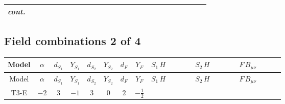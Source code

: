 \documentclass[8pt]{article}
\begin{document}
\begin{landscape}
\begin{longtable}{@{}cccccccc >{\raggedright\arraybackslash}p{0.21\linewidth} >{\raggedright\arraybackslash}p{0.21\linewidth} >{\raggedright\arraybackslash}p{0.21\linewidth}@{}}
\textit{cont.} &  &  &  &  &  &  &  & \scriptsize\adjustbox{max width=\linewidth}{$\begin{gathered} -\frac{2 \hbar  \log \left(\frac{\bar{\mu}^{2}}{m_2^2}\right) \overline{\lambda_5} H_{a_1} H_{a_2} m_2^2 \lambda_5 H_{a_1}{}^{\dagger } H_{a_2}{}^{\dagger }}{m_1^2-m_2^2}\end{gathered}$} &  &  \\
\midrule
\bottomrule
\end{longtable}
\clearpage
\subsection*{Field combinations 2 of 4}
\begin{longtable}{@{}cccccccc >{\raggedright\arraybackslash}p{0.21\linewidth} >{\raggedright\arraybackslash}p{0.21\linewidth} >{\raggedright\arraybackslash}p{0.21\linewidth}@{}}
\toprule
Model & $\alpha$ & $d_{S_1}$ & $Y_{S_1}$ & $d_{S_2}$ & $Y_{S_2}$ & $d_F$ & $Y_F$ & $S_1\,H$ & $S_2\,H$ & $F\,B_{\mu\nu}$ \\
\midrule
\endfirsthead
\toprule
Model & $\alpha$ & $d_{S_1}$ & $Y_{S_1}$ & $d_{S_2}$ & $Y_{S_2}$ & $d_F$ & $Y_F$ & $S_1\,H$ & $S_2\,H$ & $F\,B_{\mu\nu}$ \\
\midrule
\endhead
T3-E & $-2$ & $3$ & $-1$ & $3$ & $0$ & $2$ & $-\frac{1}{2}$ & \scriptsize\adjustbox{max width=\linewidth}{$\begin{gathered} +\frac{3 \hbar  H_{a_1} H_{a_2} H_{a_1}{}^{\dagger } H_{a_2}{}^{\dagger } \left(\lambda_{HS_1}^{(1)}^{(2)}\right){}^2}{2 \epsilon } \\ +\frac{3}{2} \hbar  \log \left(\frac{\bar{\mu}^{2}}{m_1^2}\right) H_{a_1} H_{a_2} H_{a_1}{}^{\dagger } H_{a_2}{}^{\dagger } \left(\lambda_{HS_1}^{(1)}^{(2)}\right){}^2\end{gathered}$} & \scriptsize\adjustbox{max width=\linewidth}{$\begin{gathered} +\frac{3 \hbar  H_{a_1} H_{a_2} H_{a_1}{}^{\dagger } H_{a_2}{}^{\dagger } \left(\lambda_{HS_2}^{(1)}^{(2)}\right){}^2}{2 \epsilon } \\ +\frac{3}{2} \hbar  \log \left(\frac{\bar{\mu}^{2}}{m_2^2}\right) H_{a_1} H_{a_2} H_{a_1}{}^{\dagger } H_{a_2}{}^{\dagger } \left(\lambda_{HS_2}^{(1)}^{(2)}\right){}^2\end{gathered}$} & \scriptsize\adjustbox{max width=\linewidth}{$\begin{gathered} -\frac{1}{2} \hbar  \log \left(\frac{\bar{\mu}^{2}}{M_F^2}\right) B_{\mu _1\mu _2}^2\end{gathered}$} \\
\midrule
\bottomrule
\end{longtable}
\clearpage

\end{landscape}
\end{document}
